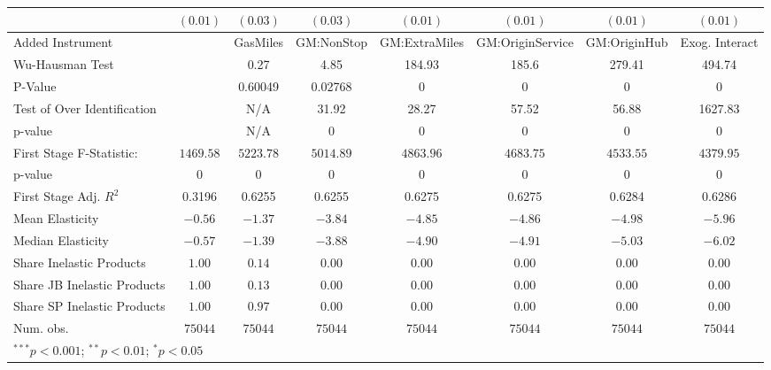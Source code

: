 \begin{tabular}{l c c c c c c c}
                             & $(0.01)$      & $(0.03)$      & $(0.03)$      & $(0.01)$      & $(0.01)$         & $(0.01)$      & $(0.01)$       \\
\midrule
Added Instrument             &               & GasMiles      & GM:NonStop    & GM:ExtraMiles & GM:OriginService & GM:OriginHub  & Exog. Interact \\
Wu-Hausman Test              &               & 0.27          & 4.85          & 184.93        & 185.6            & 279.41        & 494.74         \\
P-Value                      &               & 0.60049       & 0.02768       & 0             & 0                & 0             & 0              \\
Test of Over Identification  &               & N/A           & 31.92         & 28.27         & 57.52            & 56.88         & 1627.83        \\
p-value                      &               & N/A           & 0             & 0             & 0                & 0             & 0              \\
First Stage F-Statistic:     & $1469.58$     & $5223.78$     & $5014.89$     & $4863.96$     & $4683.75$        & $4533.55$     & $4379.95$      \\
p-value                      & $0$           & $0$           & $0$           & $0$           & $0$              & $0$           & $0$            \\
First Stage Adj. $R^2$       & 0.3196        & 0.6255        & 0.6255        & 0.6275        & 0.6275           & 0.6284        & 0.6286         \\
Mean Elasticity              & $-0.56$       & $-1.37$       & $-3.84$       & $-4.85$       & $-4.86$          & $-4.98$       & $-5.96$        \\
Median Elasticity            & $-0.57$       & $-1.39$       & $-3.88$       & $-4.90$       & $-4.91$          & $-5.03$       & $-6.02$        \\
Share Inelastic Products     & $1.00$        & $0.14$        & $0.00$        & $0.00$        & $0.00$           & $0.00$        & $0.00$         \\
Share JB Inelastic Products  & $1.00$        & $0.13$        & $0.00$        & $0.00$        & $0.00$           & $0.00$        & $0.00$         \\
Share SP Inelastic Products  & $1.00$        & $0.97$        & $0.00$        & $0.00$        & $0.00$           & $0.00$        & $0.00$         \\
Num. obs.                    & $75044$       & $75044$       & $75044$       & $75044$       & $75044$          & $75044$       & $75044$        \\
\bottomrule
\multicolumn{8}{l}{\scriptsize{$^{***}p<0.001$; $^{**}p<0.01$; $^{*}p<0.05$}}
\end{tabular}
